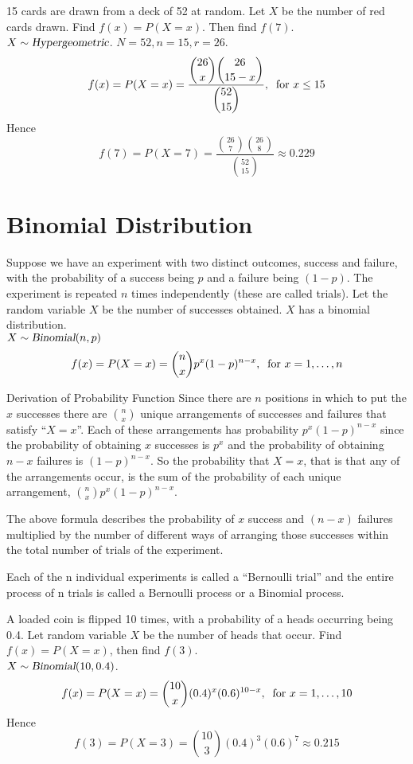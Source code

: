 \begin{example}
15 cards are drawn from a deck of 52 at random. Let $X$ be the number of red cards drawn. Find $f(x)=P(X=x)$. Then find $f(7)$. \\
$X\sim\operatorname{\textsl{Hypergeometric}}$. $N=52,n=15,r=26$.
\[
    f(x) = P(X = x) = \displaystyle\frac{\displaystyle\binom{26}{x} \binom{26}{15-x}} {\displaystyle\binom{52}{15}},\:\text{ for } x \leq 15
\]
Hence \[
    f(7) = P(X = 7) = \displaystyle\frac{\displaystyle\binom{26}{7} \binom{26}{8}} {\displaystyle\binom{52}{15}} \approx 0.229
\]
\end{example}
\section{Binomial Distribution}
Suppose we have an experiment with two distinct outcomes, success and failure, with the probability of a success being $p$ and a failure being $(1-p)$. The experiment is repeated $n$ times independently (these are called trials). Let the random variable $X$ be the number of successes obtained. $X$ has a binomial distribution. \\
$X\sim\operatorname{\textsl{Binomial}}(n,p)$
\[
    f(x) = P(X = x) = \displaystyle\binom{n}{x}p^x (1-p)^{n-x},\:\text{ for } x=1,\ldots,n
\]
\begin{theory}{Derivation of Probability Function}
Since there are $n$ positions in which to put the $x$ successes there are $\binom{n}{x}$ unique arrangements of successes and failures that satisfy ``$X = x$''. Each of these arrangements has probability $p^x (1-p)^{n-x}$ since the probability of obtaining $x$ successes is $p^x$ and the probability of obtaining $n-x$ failures is $(1-p)^{n-x}$. So the probability that $X = x$, that is that any of the arrangements occur, is the sum of the probability of each unique arrangement, $\binom{n}{x}p^x (1-p)^{n-x}$.
\end{theory}
\begin{info}
The above formula describes the probability of $x$ success and $(n-x)$ failures multiplied by the number of different ways of arranging those successes within the total number of trials of the experiment.
\end{info}
\begin{info}
Each of the n individual experiments is called a ``Bernoulli trial'' and the entire process of n trials is called a Bernoulli process or a Binomial process.
\end{info}
\begin{example}
A loaded coin is flipped 10 times, with a probability of a heads occurring being 0.4. Let random variable $X$ be the number of heads that occur. Find $f(x)=P(X=x)$, then find $f(3)$. \\
$X\sim\operatorname{\textsl{Binomial}}(10,0.4)$.
\[
    f(x) = P(X = x) = \displaystyle\binom{10}{x} (0.4)^x (0.6)^{10-x},\:\text{ for } x = 1,\ldots,10
\]
Hence 
\[
    f(3) = P(X = 3) = \displaystyle\binom{10}{3} (0.4)^3 (0.6)^7 \approx 0.215
\]
\end{example}
